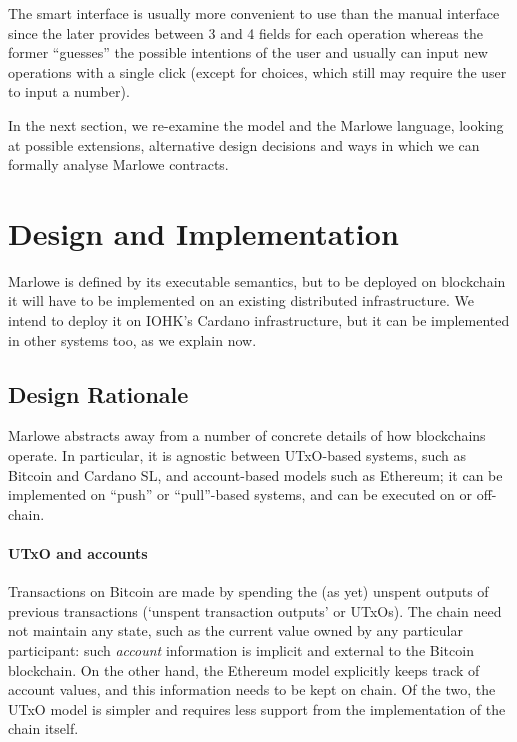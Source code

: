 \documentclass[runningheads]{llncs}
\begin{document}
The smart interface is usually more convenient to use than the manual
interface since the later provides between 3 and 4 fields for each
operation whereas the former ``guesses'' the possible intentions
of the user and usually can input new operations with a single click 
(except for choices, which still may require the user to input a number).


In the next section, we re-examine the model and the Marlowe language, looking at possible extensions, alternative 
design decisions and ways in which we can formally analyse Marlowe contracts.




\section{Design and Implementation}
\label{section:towards-implementation}

Marlowe is defined by its executable semantics, but to be deployed on blockchain it will have to be implemented on an 
existing distributed infrastructure.  We intend to deploy it on IOHK's Cardano infrastructure, but it can be implemented 
in other systems too, as we explain now.

\subsection{Design Rationale}
\label{sec:abstraction}
\label{sec:design-rationale}

Marlowe abstracts away from a number of concrete details of how blockchains operate. In particular, it is agnostic 
between UTxO-based systems, such as Bitcoin and Cardano SL, and account-based models such as Ethereum; it can be 
implemented on ``push'' or ``pull''-based systems, and can be executed on or off-chain. 

\paragraph{UTxO and accounts}

Transactions on Bitcoin are made by spending the (as yet) unspent outputs of 
previous transactions (`unspent transaction outputs' or UTxOs). The chain need not maintain any state, such as the 
current value owned by any particular participant: such \emph{account} information is implicit and external to the 
Bitcoin blockchain. On the other hand, the Ethereum model explicitly keeps track of account values, and  this 
information needs to be kept on chain. Of the two, the UTxO model is simpler and requires less support from the 
implementation of the chain itself.
\end{document}
